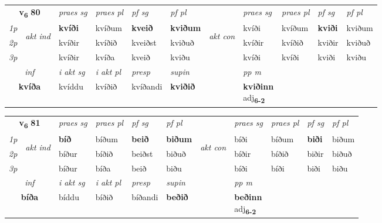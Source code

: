 \noindent
\begin{tabular}{lllllllllll} \toprule
\multicolumn{2}{c}{\textbf{v{\textsubscript{6}}} \Large{\textbf{80}}}  &  \textit{praes sg}  & \textit{praes pl}  &\textit{ pf sg} & \textit{pf pl} &  &  \textit{praes sg}  & \textit{praes pl}  & \textit{pf sg} & \textit{pf pl } \\*
	\cmidrule{3-6} \cmidrule{8-11}
 {\textit{1p}} & \multirow{3}{*}{\begin{turn}{90}\textit{akt ind}\end{turn}} & \textbf{kvíði} & kvíðum & \textbf{kveið} & \textbf{kviðum} & \multirow{3}{*}{\begin{turn}{90}\textit{akt con}\end{turn}} &kvíði & kvíðum & \textbf{kviði} & kviðum\\*
 {\textit{2p}} &  &  kvíðir  & kvíðið & kveiðst & kviðuð & & kvíðir & kvíðið & kviðir & kviðuð \\*
{\textit{3p}} &  & kvíðir & kvíða & kveið & kviðu & & kvíði & kvíði& kviði & kviðu \\*
\cmidrule{3-6} \cmidrule{8-11}

   \multicolumn{2}{c}{\textit{inf}}  & \textit{i akt sg} & \textit{i akt pl}   & \textit{presp} & \textit{supin}  && \textit{pp m} \\*
  \multicolumn{2}{c}{\textbf{kvíða}} & kvíddu  & kvíðið   & kvíðandi &  \textbf{kviðið}  && \specialcell{\textbf{kviðinn} \\ adj\textbf{\textsubscript{6-2}}} \\*
\end{tabular}

\noindent
\begin{tabular}{lllllllllll} \toprule
\multicolumn{2}{c}{\textbf{v{\textsubscript{6}}} \Large{\textbf{81}}}  &  \textit{praes sg}  & \textit{praes pl}  &\textit{ pf sg} & \textit{pf pl} &  &  \textit{praes sg}  & \textit{praes pl}  & \textit{pf sg} & \textit{pf pl } \\*
	\cmidrule{3-6} \cmidrule{8-11}
 {\textit{1p}} & \multirow{3}{*}{\begin{turn}{90}\textit{akt ind}\end{turn}} & \textbf{bíð} & bíðum & \textbf{beið} & \textbf{biðum} & \multirow{3}{*}{\begin{turn}{90}\textit{akt con}\end{turn}} &bíði & bíðum & \textbf{biði} & biðum\\*
 {\textit{2p}} &  &  bíður  & bíðið & beiðst & biðuð & & bíðir & bíðið & biðir & biðuð \\*
{\textit{3p}} &  & bíður & bíða & beið & biðu & & bíði & bíði& biði & biðu \\*
\cmidrule{3-6} \cmidrule{8-11}

   \multicolumn{2}{c}{\textit{inf}}  & \textit{i akt sg} & \textit{i akt pl}   & \textit{presp} & \textit{supin}  && \textit{pp m} \\*
  \multicolumn{2}{c}{\textbf{bíða}} & bíddu  & bíðið   & bíðandi &  \textbf{beðið}  && \specialcell{\textbf{beðinn} \\ adj\textbf{\textsubscript{6-2}}} \\*
\end{tabular}

